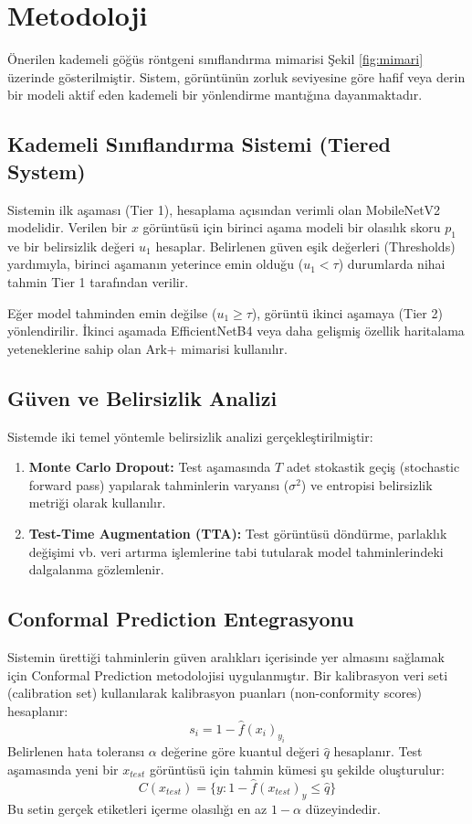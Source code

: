 \chapter{Metodoloji}
\label{ch:metodoloji}

Önerilen kademeli göğüs röntgeni sınıflandırma mimarisi Şekil \ref{fig:mimari} üzerinde gösterilmiştir. Sistem, görüntünün zorluk seviyesine göre hafif veya derin bir modeli aktif eden kademeli bir yönlendirme mantığına dayanmaktadır.

\section{Kademeli Sınıflandırma Sistemi (Tiered System)}
Sistemin ilk aşaması (Tier 1), hesaplama açısından verimli olan MobileNetV2 \cite{sandler2018mobilenetv2} modelidir. Verilen bir $x$ görüntüsü için birinci aşama modeli bir olasılık skoru $p_1$ ve bir belirsizlik değeri $u_1$ hesaplar. Belirlenen güven eşik değerleri (Thresholds) yardımıyla, birinci aşamanın yeterince emin olduğu ($u_1 < \tau$) durumlarda nihai tahmin Tier 1 tarafından verilir.

Eğer model tahminden emin değilse ($u_1 \ge \tau$), görüntü ikinci aşamaya (Tier 2) yönlendirilir. İkinci aşamada EfficientNetB4 \cite{tan2019efficientnet} veya daha gelişmiş özellik haritalama yeteneklerine sahip olan Ark+ mimarisi kullanılır.

\section{Güven ve Belirsizlik Analizi}
Sistemde iki temel yöntemle belirsizlik analizi gerçekleştirilmiştir:
\begin{enumerate}
    \item \textbf{Monte Carlo Dropout:} Test aşamasında $T$ adet stokastik geçiş (stochastic forward pass) yapılarak tahminlerin varyansı ($\sigma^2$) ve entropisi belirsizlik metriği olarak kullanılır.
    \item \textbf{Test-Time Augmentation (TTA):} Test görüntüsü döndürme, parlaklık değişimi vb. veri artırma işlemlerine tabi tutularak model tahminlerindeki dalgalanma gözlemlenir.
\end{enumerate}

\section{Conformal Prediction Entegrasyonu}
Sistemin ürettiği tahminlerin güven aralıkları içerisinde yer almasını sağlamak için Conformal Prediction metodolojisi uygulanmıştır. Bir kalibrasyon veri seti (calibration set) kullanılarak kalibrasyon puanları (non-conformity scores) hesaplanır:
\begin{equation}
    s_i = 1 - \hat{f}(x_i)_{y_i}
\end{equation}
Belirlenen hata toleransı $\alpha$ değerine göre kuantul değeri $\hat{q}$ hesaplanır. Test aşamasında yeni bir $x_{test}$ görüntüsü için tahmin kümesi şu şekilde oluşturulur:
\begin{equation}
    C(x_{test}) = \{ y : 1 - \hat{f}(x_{test})_y \le \hat{q} \}
\end{equation}
Bu setin gerçek etiketleri içerme olasılığı en az $1-\alpha$ düzeyindedir.
